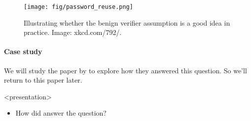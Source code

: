 \begin{frame}
  \begin{figure}
    \centering
    \texttt{[image: fig/password\_reuse.png]}
    \caption{%
      Illustrating whether the benign verifier assumption is a good idea in 
      practice.
      Image: xkcd.com/792/.
    }\label{xkcd792}
  \end{figure}
\end{frame}

\paragraph{Case study}

We will study the paper by \textcite{WhyPhishingWorks} to explore how they 
answered this question.
So we'll return to this paper later.


\begin{frame}<presentation>
  \begin{exercise}
    \begin{itemize}
      \item How did  answer the question?
    \end{itemize}
  \end{exercise}
\end{frame}


